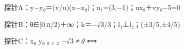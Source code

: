 \documentclass[fontset=none]{ctexart}
\begin{document}
探针A：y−y₀＝(v/u)(x−x₀)；n₁=(3,−1)；ux₀＋vy₀−5=0

探针B：θ∈[0,π/2)＋∞；k＝−√3/3；l₁⊥l₂；(±3/5,±4/5)

探针C：x₀ y₀ ₀ ₁ ₂ −√3 ≠∥⟺
\end{document}
